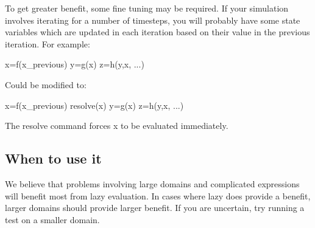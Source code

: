 To get greater benefit, some fine tuning may be required.
If your simulation involves iterating for a number of timesteps,
you will probably have some state variables which are updated in
each iteration based on their value in the previous iteration.
For example:

\begin{python}
x=f(x_previous)
y=g(x)
z=h(y,x, ...)
\end{python}

Could be modified to:

\begin{python}
x=f(x_previous)
resolve(x)
y=g(x)
z=h(y,x, ...)
\end{python}

The resolve command forces x to be evaluated immediately.

\subsection*{When to use it}
We believe that problems involving large domains and complicated expressions
will benefit most from lazy evaluation.
In cases where lazy does provide a benefit, larger domains should provide 
larger benefit.
If you are uncertain, try running a test on a smaller domain.


